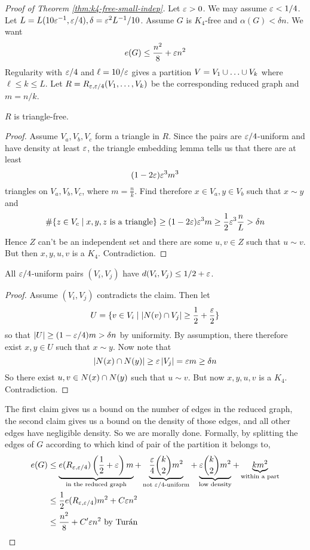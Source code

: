 \documentclass{article}
\begin{document}
\begin{proof}[Proof of Theorem \ref{thm:k4-free-small-indep}]
  Let $\varepsilon > 0$. We may assume $\varepsilon < 1/4$. Let $L = L(10\varepsilon^{-1}, \varepsilon/4), \delta = \varepsilon^2L^{-1}/10$. Assume $G$ is $K_4$-free and $\alpha(G) < \delta n$. We want
  $$e(G) \le \frac{n^2}8 + \varepsilon n^2$$
  Regularity with $\varepsilon/4$ and $\ell = 10/\varepsilon$ gives a partition $V = V_1 \union \dots \union V_k$ where $\ell \le k \le L$. Let $R = R_{\varepsilon, \varepsilon/4}(V_1, \dots, V_k)$ be the corresponding reduced graph and $m = n/k$.
  \begin{claim}
    $R$ is triangle-free.
  \end{claim}
  \begin{proof}
    Assume $V_a, V_b, V_c$ form a triangle in $R$. Since the pairs are $\varepsilon/4$-uniform and have density at least $\varepsilon$, the triangle embedding lemma tells us that there are at least
    $$(1 - 2\varepsilon)\varepsilon^3 m^3$$
    triangles on $V_a, V_b, V_c$, where $m = \frac nk$. Find therefore $x \in V_a, y \in V_b$ such that $x \sim y$ and
    $$\#\{z \in V_c \mid x, y, z\text{ is a triangle}\} \ge (1 - 2\varepsilon)\varepsilon^3m \ge \frac 12 \varepsilon^3 \frac nL > \delta n$$
    Hence $Z$ can't be an independent set and there are some $u, v \in Z$ such that $u \sim v$. But then $x, y, u, v$ is a $K_4$. Contradiction.
  \end{proof}

  \newlec

  \begin{claim}
    All $\varepsilon/4$-uniform pairs $(V_i, V_j)$ have $d(V_i, V_j) \le 1/2 + \varepsilon$.
  \end{claim}
  \begin{proof}
    Assume $(V_i, V_j)$ contradicts the claim. Then let
    $$U = \{v \in V_i \mid \left\lvert N(v) \cap V_j\right\rvert \ge \frac 12 + \frac{\varepsilon} 2\}$$
    so that $\left\lvert U\right\rvert \ge (1 - \varepsilon/4)m > \delta n$ by uniformity. By assumption, there therefore exist $x, y \in U$ such that $x \sim y$. Now note that
    $$\left\lvert N(x) \cap N(y)\right\rvert \ge \varepsilon\left\lvert V_j\right\rvert = \varepsilon m \ge \delta n$$
    So there exist $u, v \in N(x) \cap N(y)$ such that $u \sim v$. But now $x, y, u, v$ is a $K_4$. Contradiction.
  \end{proof}
  The first claim gives us a bound on the number of edges in the reduced graph, the second claim gives us a bound on the density of those edges, and all other edges have negligible density. So we are morally done. Formally, by splitting the edges of $G$ according to which kind of pair of the partition it belongs to,
  \begin{align*}
    e(G)
    & \le \underbrace{e(R_{\varepsilon, \varepsilon/4})\left(\frac 12 + \varepsilon\right)m}_{\text{in the reduced graph}}
    + \underbrace{\frac{\varepsilon} 4 \binom k2 m^2}_{\text{not $\varepsilon/4$-uniform}}
    + \underbrace{\varepsilon \binom k2 m^2}_{\text{low density}}
    + \underbrace{k m^2}_{\text{within a part}} \\
    & \le \frac 12 e(R_{\varepsilon, \varepsilon/4}) m^2 + C\varepsilon n^2 \\
    & \le \frac{n^2}8 + C'\varepsilon n^2 \text{ by Tur\' an}
  \end{align*}
\end{proof}
\end{document}
